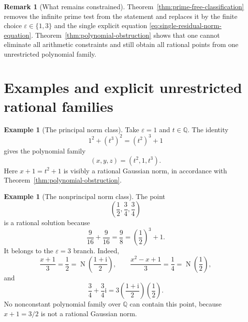 \documentclass[11pt,a4paper]{article}
\numberwithin{equation}{section}
\theoremstyle{definition}
\newtheorem{example}[theorem]{Example}
\newtheorem{remark}[theorem]{Remark}
\newcommand{\Q}{\mathbb Q}
\newcommand{\ii}{\mathrm i}
\newcommand{\N}{\operatorname N}
\begin{document}
\begin{remark}[What remains constrained]
Theorem~\ref{thm:prime-free-classification} removes the infinite prime test
from the statement and replaces it by the finite choice
$\varepsilon\in\{1,3\}$ and the single explicit equation
\eqref{eq:single-residual-norm-equation}.  Theorem~\ref{thm:polynomial-obstruction}
shows that one cannot eliminate all arithmetic constraints and still obtain
all rational points from one unrestricted polynomial family.
\end{remark}

\section{Examples and explicit unrestricted rational families}

\begin{example}[The principal norm class]
Take $\varepsilon=1$ and $t\in\Q$.  The identity
\[
 1^2+(t^3)^2=(t^2)^3+1
\]
gives the polynomial family
\begin{equation}
 (x,y,z)=(t^2,1,t^3).
 \label{eq:square-x-family}
\end{equation}
Here $x+1=t^2+1$ is visibly a rational Gaussian norm, in accordance with
Theorem~\ref{thm:polynomial-obstruction}.
\end{example}

\begin{example}[The nonprincipal norm class]
The point
\[
 \left(\frac12,\frac34,\frac34\right)
\]
is a rational solution because
\[
 \frac{9}{16}+\frac{9}{16}=\frac98
 =\left(\frac12\right)^3+1.
\]
It belongs to the $\varepsilon=3$ branch.  Indeed,
\[
 \frac{x+1}{3}=\frac12
 =\N\!\left(\frac{1+\ii}{2}\right),
 \qquad
 \frac{x^2-x+1}{3}=\frac14
 =\N\!\left(\frac12\right),
\]
and
\[
 \frac34+\frac34\ii
 =3\left(\frac{1+\ii}{2}\right)\left(\frac12\right).
\]
No nonconstant polynomial family over $\Q$ can contain this point, because
$x+1=3/2$ is not a rational Gaussian norm.
\end{example}
\end{document}
